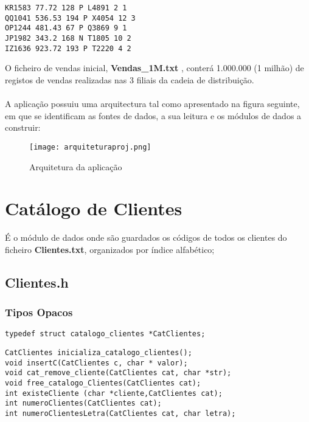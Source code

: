  \begin{Verbatim}
KR1583 77.72 128 P L4891 2 1
QQ1041 536.53 194 P X4054 12 3
OP1244 481.43 67 P Q3869 9 1
JP1982 343.2 168 N T1805 10 2
IZ1636 923.72 193 P T2220 4 2 
 \end{Verbatim}
 
 
O ficheiro de vendas inicial, \textbf{Vendas\_1M.txt} , conterá 1.000.000 (1 milhão) de registos de vendas realizadas nas 3 filiais da cadeia de distribuição. 
 
\paragraph{}
A aplicação possuiu uma arquitectura tal como apresentado na figura seguinte, em que se identificam as fontes de dados, a sua leitura e os módulos de dados a construir: 

\begin{figure}  
	\texttt{[image: arquiteturaproj.png]}  
	\caption{Arquitetura da aplicação}  
\end{figure}



\section{Catálogo de Clientes}
É o módulo de dados onde são guardados os códigos de todos os clientes do ficheiro \textbf{Clientes.txt}, organizados por índice alfabético; 

\subsection{Clientes.h}
\subsubsection{Tipos Opacos}

\begin{Verbatim}
typedef struct catalogo_clientes *CatClientes;
\end{Verbatim}


\begin{Verbatim}
CatClientes inicializa_catalogo_clientes();
void insertC(CatClientes c, char * valor);
void cat_remove_cliente(CatClientes cat, char *str);
void free_catalogo_Clientes(CatClientes cat);
int existeCliente (char *cliente,CatClientes cat);
int numeroClientes(CatClientes cat);
int numeroClientesLetra(CatClientes cat, char letra);
\end{Verbatim}

